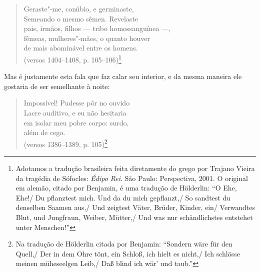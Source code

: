 \begin{verse}
Geraste"-me, conúbio, e germinaste,\\
Semeando o mesmo sêmen. Revelaste\\
pais, irmãos, filhos \qb{}--- tribo homossanguínea ---,\\
fêmeas, mulheres"-mães, o quanto houver\\
de mais abominável entre os homens.\\
(versos 1404--1408, p. 105--106)\footnote{Adotamos a tradução
  brasileira feita diretamente do grego por Trajano Vieira da tragédia
  de Sófocles: \emph{Édipo Rei}. São Paulo: Perspectiva, 2001. O
  original em alemão, citado por Benjamin, é uma tradução de Hölderlin:
  ``O Ehe, Ehe!/ Du pflanztest mich. Und da du mich gepflanzt,/
  So sandtest du denselben Saamen aus,/
  Und zeigtest Väter, Brüder, Kinder, ein/
  Verwandtes Blut, und Jungfraun, Weiber, Mütter,/
  Und was nur schändlichstes entstehet unter Menschen!'' \versal{[N.~T.]}}
\end{verse}

Mas é justamente esta fala que faz calar seu interior, e da mesma maneira ele
gostaria de ser semelhante à noite:

\begin{verse}
Impossível! Pudesse pôr no ouvido\\
Lacre auditivo, e eu não hesitaria\\
em isolar meu pobre corpo: surdo,\\
além de cego.\\
(versos 1386--1389, p. 105)\footnote{Na tradução de Hölderlin
  citada por Benjamin: ``Sondern wäre für den Quell,/ Der in dem Ohre
  tönt, ein Schloß, ich hielt es nicht,/ Ich schlösse meinen müheseelgen
  Leib,/ Daß blind ich wär' und taub.'' \versal{[N.~T.]}}
\end{verse}

